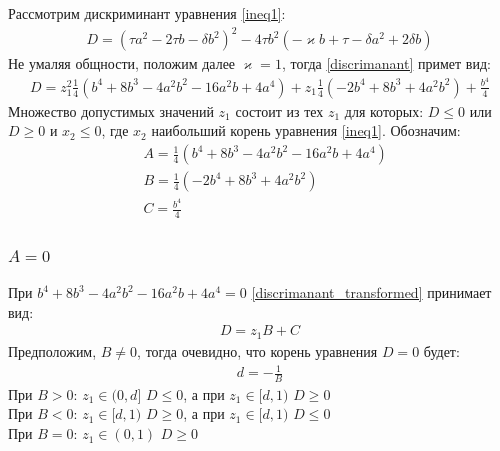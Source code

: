 \documentclass[a4paper]{article}
\begin{document}
Рассмотрим дискриминант уравнения \eqref{ineq1}:
\begin{equation}\label{discrimanant}
 \begin{aligned}
D = (\tau a^2-2 \tau b - \delta b^2)^2 - 4\tau b^2 (-\varkappa b+\tau-\delta a^2 + 2\delta b)
 \end{aligned}
\end{equation} 
Не умаляя общности, положим далее $\varkappa = 1$, тогда \eqref{discrimanant} примет вид:
\begin{equation}\label{discrimanant_transformed}
 \begin{aligned}
D = z_1^2\frac{1}{4}(b^4 + 8 b^3 - 4 a^2 b^2 - 16 a^2 b + 4 a^4 )+z_1\frac{1}{4}(- 2 b^4 + 8 b^3 + 4 a^2 b^2) + \frac{b^4}{4}
 \end{aligned}
\end{equation}
Множество допустимых значений $z_1$ состоит из тех $z_1$ для которых:   $D \leq 0$ или $D \geq 0$ и $x_2 \leq 0$, где $x_2$ наибольший корень уравнения \eqref{ineq1}. Обозначим:
\begin{equation}
 \begin{aligned}
&A = \frac{1}{4}(b^4 + 8 b^3 - 4 a^2 b^2 - 16 a^2 b + 4 a^4)\\
&B = \frac{1}{4}(- 2 b^4 + 8 b^3 + 4 a^2 b^2)\\
&C = \frac{b^4}{4}
 \end{aligned}
\end{equation}
\subsubsection{$A  = 0$}
 При $b^4 + 8 b^3 - 4 a^2 b^2 - 16 a^2 b + 4 a^4  = 0$ \eqref{discrimanant_transformed} принимает вид:
\begin{equation}
 \begin{aligned}
D = z_1B + C
 \end{aligned}
\end{equation}
Предположим, $B \neq 0$, тогда очевидно, что корень уравнения $D = 0$ будет:
\begin{equation}
 \begin{aligned}
d = - \frac{1}{B}
 \end{aligned}
\end{equation}
При $B > 0$: $z_1 \in (0, d]$ $D \leq 0$, а при $z_1 \in [d, 1)$ $D \geq 0$\\
При $B < 0$: $z_1 \in [d, 1)$ $D \geq 0$, а при $z_1 \in [d, 1)$ $D \leq 0$\\
При $B = 0$: $z_1 \in (0, 1)$ $D \geq 0$
\end{document}
